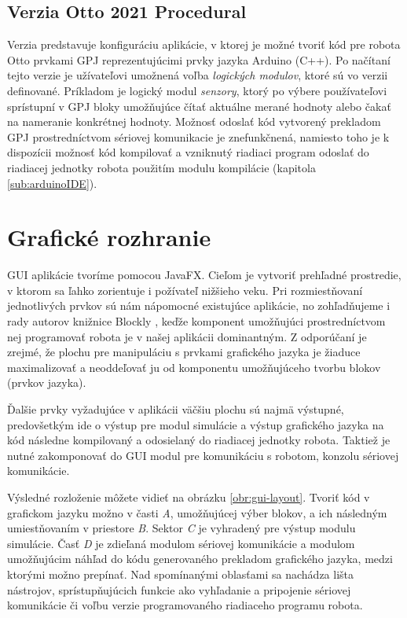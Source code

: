 \subsection{Verzia Otto 2021 Procedural}
\label{sub:verzia-otto-2021-procedural}
Verzia  predstavuje konfiguráciu aplikácie, v ktorej je možné tvoriť kód pre robota Otto prvkami GPJ reprezentujúcimi prvky jazyka Arduino (C++). Po načítaní tejto verzie je užívateľovi umožnená voľba \textit{logických modulov}, ktoré sú vo verzii definované. Príkladom je logický modul \textit{senzory}, ktorý po výbere používateľovi sprístupní v GPJ bloky umožňujúce čítať aktuálne merané hodnoty alebo čakať na nameranie konkrétnej hodnoty. Možnosť odoslať kód vytvorený prekladom GPJ prostredníctvom sériovej komunikacie je znefunkčnená, namiesto toho je k dispozícii možnosť  kód kompilovať a vzniknutý riadiaci program odoslať do riadiacej jednotky robota použitím modulu kompilácie (kapitola \ref{sub:arduinoIDE}).

\newpage

\section{Grafické rozhranie}
GUI aplikácie tvoríme pomocou JavaFX. Cieľom je vytvoriť prehľadné prostredie, v ktorom sa ľahko zorientuje i požívateľ nižšieho veku. Pri rozmiestňovaní jednotlivých prvkov sú nám nápomocné existujúce aplikácie, no zohľadňujeme i rady autorov knižnice Blockly \cite{blocklyBestPractices}, keďže komponent umožňujúci prostredníctvom nej programovať robota je v našej aplikácii dominantným. Z odporúčaní je zrejmé, že plochu pre manipuláciu s prvkami grafického jazyka je žiaduce maximalizovať a neoddeľovať ju od komponentu umožňujúceho tvorbu blokov (prvkov jazyka).

Ďalšie prvky vyžadujúce v aplikácii väčšiu plochu sú najmä výstupné, predovšetkým ide o výstup pre modul simulácie a výstup  grafického jazyka na kód následne kompilovaný a odosielaný do riadiacej jednotky robota. Taktiež je nutné zakomponovať do GUI modul pre komunikáciu s robotom, konzolu sériovej komunikácie.

Výsledné rozloženie môžete vidieť na obrázku \ref{obr:gui-layout}. Tvoriť kód v grafickom jazyku možno v časti \textit{A}, umožňujúcej výber blokov, a ich následným umiestňovaním v priestore \textit{B}. Sektor \textit{C} je vyhradený pre výstup modulu simulácie. Časť \textit{D} je zdieľaná modulom sériovej komunikácie a modulom umožňujúcim náhľad do kódu generovaného prekladom grafického jazyka, medzi ktorými možno prepínať. Nad spomínanými oblasťami sa nachádza lišta nástrojov, sprístupňujúcich funkcie ako vyhľadanie a pripojenie sériovej komunikácie či voľbu verzie programovaného riadiaceho programu robota.

